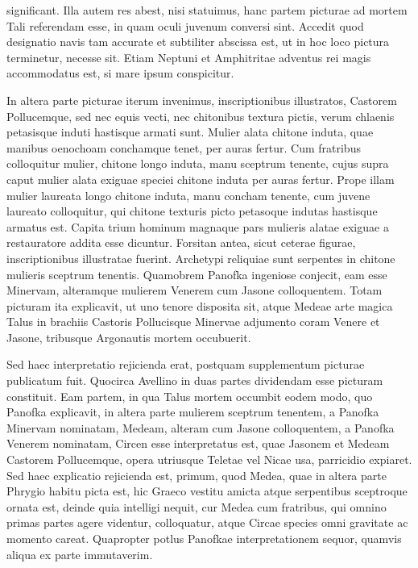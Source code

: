 \documentclass[a4paper, 11pt, oneside, polutonikogreek, german]{article}
\begin{document}
significant. Illa autem res abest, nisi statuimus, hanc partem picturae ad mortem Tali referendam esse, in quam oculi juvenum conversi sint. Accedit quod designatio navis tam accurate et subtiliter abscissa est, ut in hoc loco pictura terminetur, necesse sit. Etiam Neptuni et Amphitritae adventus rei magis accommodatus est, si mare ipsum conspicitur.

In altera parte picturae iterum invenimus, inscriptionibus illustratos, Castorem Pollucemque, sed nec equis vecti, nec chitonibus textura pictis, verum chlaenis petasisque induti hastisque armati sunt. Mulier alata chitone induta, quae manibus oenochoam conchamque tenet, per auras fertur. Cum fratribus colloquitur mulier, chitone longo induta, manu sceptrum tenente, cujus supra caput mulier alata exiguae speciei chitone induta per auras fertur. Prope illam mulier laureata longo chitone induta, manu concham tenente, cum juvene laureato colloquitur, qui chitone texturis picto petasoque indutas hastisque armatus est. Capita trium hominum magnaque pars mulieris alatae exiguae a restauratore addita esse dicuntur. Forsitan antea, sicut ceterae figurae, inscriptionibus illustratae fuerint. Archetypi reliquiae sunt serpentes in chitone mulieris sceptrum tenentis. Quamobrem Panofka ingeniose conjecit, eam esse Minervam, alteramque mulierem Venerem cum Jasone colloquentem. Totam picturam ita explicavit, ut uno tenore disposita sit, atque Medeae arte magica Talus in brachiis Castoris Pollucisque Minervae adjumento coram Venere et Jasone, tribusque Argonautis mortem occubuerit.

Sed haec interpretatio rejicienda erat, postquam supplementum picturae publicatum fuit. Quocirca Avellino in duas partes dividendam esse picturam constituit. Eam partem, in qua Talus mortem occumbit eodem modo, quo Panofka explicavit, in altera parte mulierem sceptrum tenentem, a Panofka Minervam nominatam, Medeam, alteram cum Jasone colloquentem, a Panofka Venerem nominatam, Circen esse interpretatus est, quae Jasonem et Medeam Castorem Pollucemque, opera utriusque Teletae vel Nicae usa, parricidio expiaret. Sed haec explicatio rejicienda est, primum, quod Medea, quae in altera parte Phrygio habitu picta est, hic Graeco vestitu amicta atque serpentibus sceptroque ornata est, deinde quia intelligi nequit, cur Medea cum fratribus, qui omnino primas partes agere videntur, colloquatur, atque Circae species omni gravitate ac momento careat. Quapropter potlus Panofkae interpretationem sequor, quamvis aliqua ex parte immutaverim.
\end{document}
